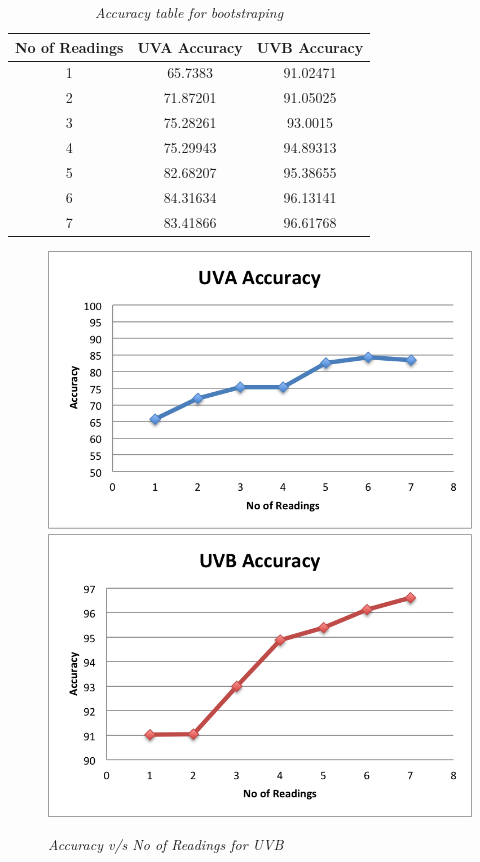 \documentclass[12pt,fullpage,doublespace]{article}
\begin{document}
\newpage
\begin{table}
\centering
\begin{tabular}{|c|c|c|}
\hline
No of Readings & UVA Accuracy & UVB Accuracy \\
\hline 
1 & 65.7383 & 91.02471\\
\hline
2 & 71.87201 & 91.05025\\
\hline
3 & 75.28261 & 93.0015\\
\hline
4 & 75.29943 & 94.89313\\
\hline
5 & 82.68207 & 95.38655\\
\hline
6 & 84.31634 & 96.13141\\
\hline
7 & 83.41866 & 96.61768\\
\hline
\end{tabular}
\caption{\small \sl Accuracy table  for bootstraping}\label{seg4accuracy}
\end{table}


\begin{figure}
\begin{center}
\includegraphics[scale=0.5]{segment4uva.png}
\includegraphics[scale=0.5]{segment4uvb.png}
\caption{\small \sl Accuracy v/s No of Readings for UVB}
\label{fig:lessReadings}
\end{center}
\end{figure}
\end{document}
